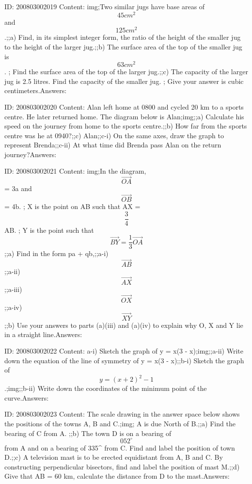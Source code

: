 \documentclass{article}
\begin{document}
ID: 200803002019
Content:
img;Two similar jugs have base areas of $$45 cm^2$$ and $$125 cm^2$$.;;a) Find, in its simplest integer form, the ratio of the height of the smaller jug to the height of the larger jug.;;b) The surface area of the top of the smaller jug is $$63 cm^2$$. ; Find the surface area of the top of the larger jug.;;c) The capacity of the larger jug is 2.5 litres. Find the capacity of the smaller jug. ; Give your answer is cubic centimeters.Answers:

ID: 200803002020
Content:
Alan left home at 0800 and cycled 20 km to a sports centre. He later returned home. The diagram below is Alan;img;;a) Calculate his speed on the journey from home to the sports centre.;;b) How far from the sports centre was he at 0940?;;c) Alan;;c-i) On the same axes, draw the graph to represent Brenda;;c-ii) At what time did Brenda pass Alan on the return journey?Answers:

ID: 200803002021
Content:
img;In the diagram, $$\vec{OA}$$ = 3a and $$\vec{OB}$$ = 4b. ; X is the point on AB such that AX = $$\frac{3}{4}$$AB. ; Y is the point such that $$\vec{BY}= \frac{1}{3} \vec{OA}$$;;a) Find in the form pa + qb,;;a-i) $$\vec{AB}$$;;a-ii) $$\vec{AX}$$;;a-iii) $$\vec{OX}$$;;a-iv) $$\vec{XY}$$;;b) Use your answers to parts (a)(iii) and (a)(iv) to explain why O, X and Y lie in a straight line.Answers:

ID: 200803002022
Content:
a-i) Sketch the graph of y = x(3 - x);img;;a-ii) Write down the equation of the line of symmetry of y = x(3 - x);;b-i) Sketch the graph of $$y = (x + 2)^2 - 1$$.;img;;b-ii) Write down the coordinates of the minimum point of the curve.Answers:

ID: 200803002023
Content:
The scale drawing in the answer space below shows the positions of the towns A, B and C.;img; A is due North of B.;;a) Find the bearing of C from A. ;;b) The town D is on a bearing of $$052^{\circ}$$ from A and on a bearing of 335^{\circ} from C. Find and label the position of town D.;;c) A television mast is to be erected equidistant from A, B and C. By constructing perpendicular bisectors, find and label the position of mast M.;;d) Give that AB = 60 km, calculate the distance from D to the mast.Answers:
\end{document}
